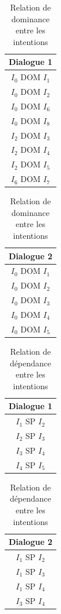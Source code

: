 \begin{table}
	\parbox{.45\linewidth}{
		\centering
		\begin{tabular}{c}
			\hline
			\hline
			Dialogue 1 \\
			\hline
			\hline
			$I_0$ DOM $I_1$ \\
			$I_0$ DOM $I_2$ \\
			$I_0$ DOM $I_6$ \\
			$I_0$ DOM $I_8$ \\
			$I_2$ DOM $I_3$ \\
			$I_2$ DOM $I_4$ \\
			$I_2$ DOM $I_5$ \\
			$I_6$ DOM $I_7$ \\
			\hline
			\hline
		\end{tabular}
	}
	\hfill
	\parbox{.45\linewidth}{
		\centering
		\begin{tabular}{c}
			\hline
			\hline
			Dialogue 2 \\
			\hline
			\hline
			$I_0$ DOM $I_1$ \\
			$I_0$ DOM $I_2$ \\
			$I_0$ DOM $I_3$ \\
			$I_0$ DOM $I_4$ \\
			$I_0$ DOM $I_5$ \\
			\hline
			\hline
		\end{tabular} 
		
	}
	\caption{ \label{tab:domRelation} Relation de dominance entre les intentions}
\end{table}

\begin{table}
	\parbox{.45\linewidth}{
		\centering
		\begin{tabular}{c}
			\hline
			\hline
			Dialogue 1 \\
			\hline
			\hline
			$I_1$ SP $I_2$ \\
			$I_2$ SP $I_3$ \\
			$I_3$ SP $I_4$ \\
			$I_4$ SP $I_5$ \\
			\hline
			\hline
			
		\end{tabular}
	}
	\hfill
	\parbox{.45\linewidth}{
		\centering
		\begin{tabular}{c}
			\hline
			\hline
			Dialogue 2 \\
			\hline
			\hline
			$I_1$ SP $I_2$ \\
			$I_1$ SP $I_3$ \\
			$I_1$ SP $I_4$ \\
			$I_3$ SP $I_4$ \\
			\hline
			\hline
		\end{tabular} 
		
	}
	\caption{ \label{tab:dependanceRelation} Relation de dépendance entre les intentions}
\end{table}

